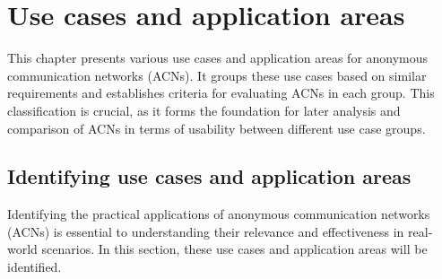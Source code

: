 \chapter{Use cases and application areas}
\label{chap:UseCases}

This chapter presents various use cases and application areas for anonymous communication networks (ACNs). It groups these use cases based on similar requirements and establishes criteria for evaluating ACNs in each group. This classification is crucial, as it forms the foundation for later analysis and comparison of ACNs in terms of usability between different use case groups.

\section{Identifying use cases and application areas}
Identifying the practical applications of anonymous communication networks (ACNs) is essential to understanding their relevance and effectiveness in real-world scenarios. In this section, these use cases and application areas will be identified.

